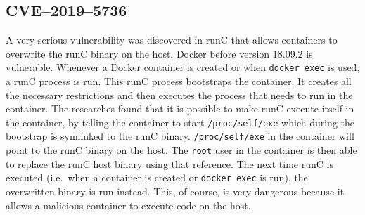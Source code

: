 \subsection{CVE--2019--5736}\label{CVE-2019-5736}
A very serious vulnerability was discovered in runC that allows containers to overwrite the runC binary on the host. Docker before version 18.09.2 is vulnerable. Whenever a Docker container is created or when \lstinline{docker exec} is used, a runC process is run. This runC process bootstraps the container. It creates all the necessary restrictions and then executes the process that needs to run in the container. The researches found that it is possible to make runC execute itself in the container, by telling the container to start \lstinline{/proc/self/exe} which during the bootstrap is symlinked to the runC binary\cite{CVE-2019-5736-DragonSector}\cite{CVE-2019-5736-Github}. \lstinline{/proc/self/exe} in the container will point to the runC binary on the host. The \lstinline{root} user in the container is then able to replace the runC host binary using that reference. The next time runC is executed (i.e.\ when a container is created or \lstinline{docker exec} is run), the overwritten binary is run instead. This, of course, is very dangerous because it allows a malicious container to execute code on the host.
